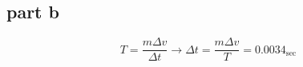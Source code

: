 \subsection{part b}
$$
T = \dfrac{m \Delta v}{\Delta t} \rightarrow \Delta t = \dfrac{m \Delta v}{T} = 0.0034_{\sec}
$$